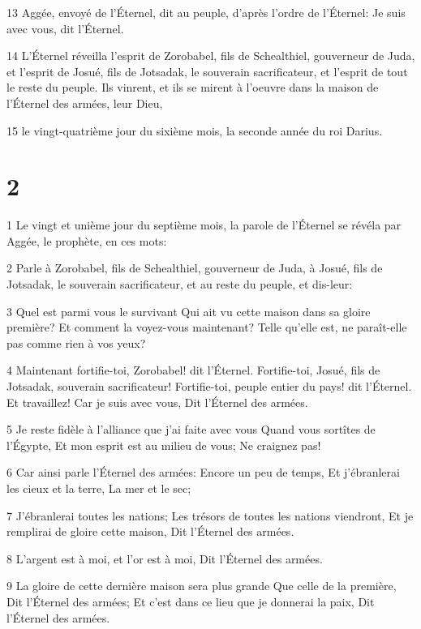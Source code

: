 \par 13 Aggée, envoyé de l'Éternel, dit au peuple, d'après l'ordre de l'Éternel: Je suis avec vous, dit l'Éternel.
\par 14 L'Éternel réveilla l'esprit de Zorobabel, fils de Schealthiel, gouverneur de Juda, et l'esprit de Josué, fils de Jotsadak, le souverain sacrificateur, et l'esprit de tout le reste du peuple. Ils vinrent, et ils se mirent à l'oeuvre dans la maison de l'Éternel des armées, leur Dieu,
\par 15 le vingt-quatrième jour du sixième mois, la seconde année du roi Darius.

\chapter{2}

\par 1 Le vingt et unième jour du septième mois, la parole de l'Éternel se révéla par Aggée, le prophète, en ces mots:
\par 2 Parle à Zorobabel, fils de Schealthiel, gouverneur de Juda, à Josué, fils de Jotsadak, le souverain sacrificateur, et au reste du peuple, et dis-leur:
\par 3 Quel est parmi vous le survivant Qui ait vu cette maison dans sa gloire première? Et comment la voyez-vous maintenant? Telle qu'elle est, ne paraît-elle pas comme rien à vos yeux?
\par 4 Maintenant fortifie-toi, Zorobabel! dit l'Éternel. Fortifie-toi, Josué, fils de Jotsadak, souverain sacrificateur! Fortifie-toi, peuple entier du pays! dit l'Éternel. Et travaillez! Car je suis avec vous, Dit l'Éternel des armées.
\par 5 Je reste fidèle à l'alliance que j'ai faite avec vous Quand vous sortîtes de l'Égypte, Et mon esprit est au milieu de vous; Ne craignez pas!
\par 6 Car ainsi parle l'Éternel des armées: Encore un peu de temps, Et j'ébranlerai les cieux et la terre, La mer et le sec;
\par 7 J'ébranlerai toutes les nations; Les trésors de toutes les nations viendront, Et je remplirai de gloire cette maison, Dit l'Éternel des armées.
\par 8 L'argent est à moi, et l'or est à moi, Dit l'Éternel des armées.
\par 9 La gloire de cette dernière maison sera plus grande Que celle de la première, Dit l'Éternel des armées; Et c'est dans ce lieu que je donnerai la paix, Dit l'Éternel des armées.
